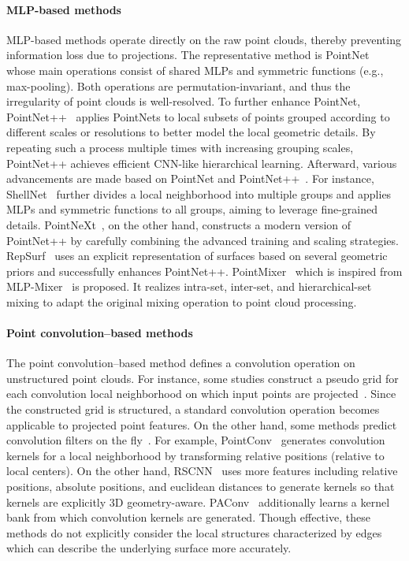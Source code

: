 \documentclass[a4paper,fleqn]{cas-dc}
\begin{document}
\paragraph{MLP-based methods}
MLP-based methods operate directly on the raw point clouds, thereby preventing information loss due to projections. The representative method is PointNet~\cite{qi2017pointnet} whose main operations consist of shared MLPs and symmetric functions (e.g., max-pooling). Both operations are permutation-invariant, and thus the irregularity of point clouds is well-resolved. To further enhance PointNet, PointNet++~\cite{qi2017pointnet++} applies PointNets to local subsets of points grouped according to different scales or resolutions to better model the local geometric details. By repeating such a process multiple times with increasing grouping scales, PointNet++ achieves efficient CNN-like hierarchical learning. Afterward, various advancements are made based on PointNet and PointNet++~\cite{lan2019modeling,qiu2021geometric}. For instance, ShellNet~\cite{zhang2019shellnet} further divides a local neighborhood into multiple groups and applies MLPs and symmetric functions to all groups, aiming to leverage fine-grained details. PointNeXt~\cite{qian2022pointnext}, on the other hand, constructs a modern version of PointNet++ by carefully combining the advanced training and scaling strategies. RepSurf~\cite{ran2022surface} uses an explicit representation of surfaces based on several geometric priors and successfully enhances PointNet++. PointMixer~\cite{choe2022pointmixer} which is inspired from MLP-Mixer~\cite{tolstikhin2021mlp} is proposed. It realizes intra-set, inter-set, and hierarchical-set mixing to adapt the original mixing operation to point cloud processing.

\paragraph{Point convolution--based methods}
The point convolution--based method defines a convolution operation on unstructured point clouds. For instance, some studies construct a pseudo grid for each convolution local neighborhood on which input points are projected~\cite{thomas2019kpconv,mao2019interpolated, liu2020closer}. Since the constructed grid is structured, a standard convolution operation becomes applicable to projected point features. On the other hand, some methods predict convolution filters on the fly~\cite {li2018pointcnn,wu2019pointconv,liu2019relation}. For example, PointConv~\cite{wu2019pointconv} generates convolution kernels for a local neighborhood by transforming relative positions (relative to local centers). On the other hand, RSCNN~\cite{liu2019relation} uses more features including relative positions, absolute positions, and euclidean distances to generate kernels so that kernels are explicitly 3D geometry-aware. PAConv~\cite{xu2021paconv} additionally learns a kernel bank from which convolution kernels are generated. Though effective, these methods do not explicitly consider the local structures characterized by edges which can describe the underlying surface more accurately.  
\end{document}
